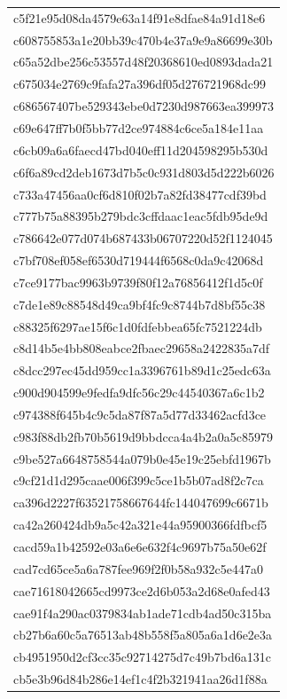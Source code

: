 \begin{tabular}{l}
c5f21e95d08da4579e63a14f91e8dfae84a91d18e6 \\
c608755853a1e20bb39c470b4e37a9e9a86699e30b \\
c65a52dbe256c53557d48f20368610ed0893dada21 \\
c675034e2769c9fafa27a396df05d276721968dc99 \\
c686567407be529343ebe0d7230d987663ea399973 \\
c69e647ff7b0f5bb77d2ce974884c6ce5a184e11aa \\
c6cb09a6a6faecd47bd040eff11d204598295b530d \\
c6f6a89cd2deb1673d7b5c0c931d803d5d222b6026 \\
c733a47456aa0cf6d810f02b7a82fd38477cdf39bd \\
c777b75a88395b279bdc3cffdaac1eac5fdb95de9d \\
c786642e077d074b687433b06707220d52f1124045 \\
c7bf708ef058ef6530d719444f6568c0da9c42068d \\
c7ce9177bac9963b9739f80f12a76856412f1d5c0f \\
c7de1e89c88548d49ca9bf4fc9c8744b7d8bf55c38 \\
c88325f6297ae15f6c1d0fdfebbea65fc7521224db \\
c8d14b5e4bb808eabce2fbaec29658a2422835a7df \\
c8dcc297ec45dd959cc1a3396761b89d1c25edc63a \\
c900d904599e9fedfa9dfc56c29c44540367a6c1b2 \\
c974388f645b4c9c5da87f87a5d77d33462acfd3ce \\
c983f88db2fb70b5619d9bbdcca4a4b2a0a5c85979 \\
c9be527a6648758544a079b0e45e19c25ebfd1967b \\
c9cf21d1d295caae006f399c5ce1b5b07ad8f2c7ca \\
ca396d2227f63521758667644fc144047699c6671b \\
ca42a260424db9a5c42a321e44a95900366fdfbcf5 \\
cacd59a1b42592e03a6e6e632f4c9697b75a50e62f \\
cad7cd65ce5a6a787fee969f2f0b58a932c5e447a0 \\
cae71618042665cd9973ce2d6b053a2d68e0afed43 \\
cae91f4a290ac0379834ab1ade71cdb4ad50c315ba \\
cb27b6a60c5a76513ab48b558f5a805a6a1d6e2e3a \\
cb4951950d2cf3cc35c92714275d7c49b7bd6a131c \\
cb5e3b96d84b286e14ef1c4f2b321941aa26d1f88a \\

\end{tabular}
